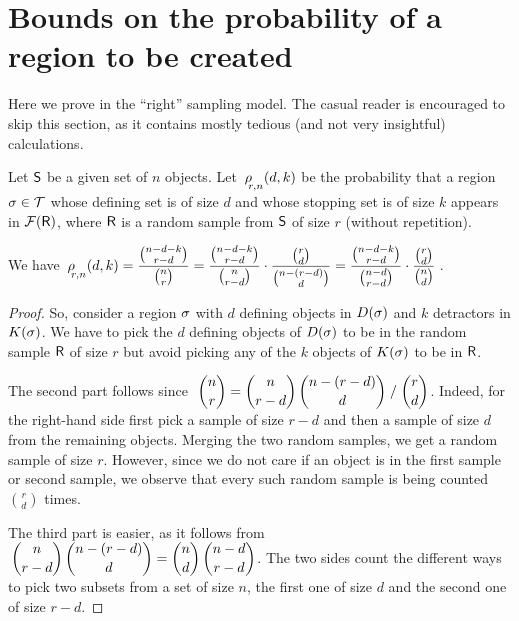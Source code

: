 \section{Bounds on the probability of a %
   region to be created}

Here we prove  in the ``right'' sampling
model. The casual reader is encouraged to skip this section, as it
contains mostly tedious (and not very insightful) calculations.


Let $\mathsf{S}$ be a given set of $n$ objects.  Let
$\CSProbFull{r}{d}{k}{n}$ be the probability that a region $\sigma \in
\mathcal{T}$ whose defining set is of size $d$ and whose stopping set
is of size $k$ appears in $\RegionsSet{\Sample}$, where $\mathsf{R}$ is a
random sample from $\mathsf{S}$ of size $r$ (without repetition).

\begin{lemma}
    We have $\ds\CSProbFull{r}{d}{k}{n} =%
    \frac{\binom{n-d-k}{r-d}} { \binom{n}{r}} =%
    \frac{\binom{n-d-k}{r-d}}{\binom{n}{r-d}} \cdot
    \frac{\binom{r}{d}}{\binom{n-(r-d)}{d}}%
    =%
    \frac{\binom{n-d-k}{r-d}}{\binom{n-d}{r-d}} \cdot
    \frac{\binom{r}{d}}{\binom{n}{d}}$\,.
\end{lemma}
\begin{proof}
    So, consider a region $\sigma$ with $d$ defining objects in
    $\DefSet{\Trap}$ and $k$ detractors in $\KillSet{ \Trap }$.  We
    have to pick the $d$ defining objects of $\DefSet{\Trap}$ to be in
    the random sample  $\mathsf{R}$ of size $r$ but
    avoid picking any of the $k$ objects of $\KillSet{\Trap}$ to be in
    $\mathsf{R}$.
    
    The second part follows since $\;\displaystyle \binom{n}{r} =
    {\binom{n}{r-d}\, \binom{n-(r-d)}{d}} \;/\; {\binom{r}{d}}$.
    Indeed, for the right-hand side first pick a sample of size $r-d$
    and then a sample of size $d$ from the remaining objects. Merging
    the two random samples, we get a random sample of size
    $r$. However, since we do not care if an object is in the first
    sample or second sample, we observe that every such random sample
    is being counted $\binom{r}{d}$ times.
    
    The third part is easier, as it follows from $\,\displaystyle \binom{n}{r-d}
    \, \binom{n-(r-d)}{d} = \binom{n}{d} \, \binom{n-d}{r-d}$. The two
    sides count the different ways to pick two subsets from a set of
    size $n$, the first one of size $d$ and the second one of size
    $r-d$.
\end{proof}


